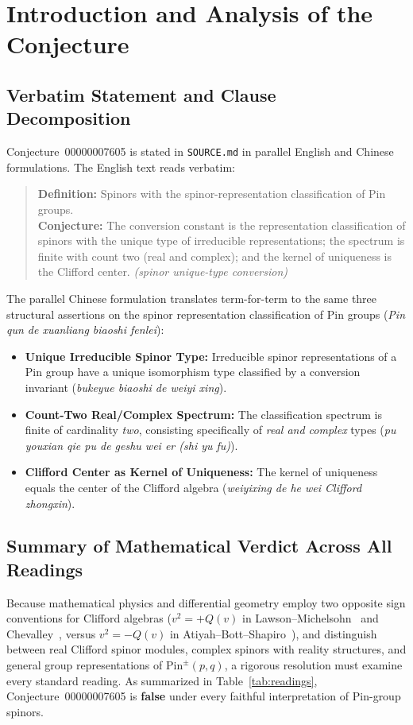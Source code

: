 \documentclass[11pt,a4paper]{article}
\theoremstyle{plain}
\theoremstyle{definition}
\newcommand{\Pin}{\mathrm{Pin}}
\begin{document}
\section{Introduction and Analysis of the Conjecture}

\subsection{Verbatim Statement and Clause Decomposition}
Conjecture~00000007605 is stated in \texttt{SOURCE.md} in parallel English and Chinese formulations. The English text reads verbatim:
\begin{quote}
\textbf{Definition:} Spinors with the spinor-representation classification of Pin groups.\\
\textbf{Conjecture:} The conversion constant is the representation classification of spinors with the unique type of irreducible representations; the spectrum is finite with count two (real and complex); and the kernel of uniqueness is the Clifford center. \emph{(spinor unique-type conversion)}
\end{quote}
The parallel Chinese formulation translates term-for-term to the same three structural assertions on the spinor representation classification of $\Pin$ groups (\emph{Pin qun de xuanliang biaoshi fenlei}):
\begin{itemize}
\item[\textbf{(Claim A)}] \textbf{Unique Irreducible Spinor Type:} Irreducible spinor representations of a $\Pin$ group have a unique isomorphism type classified by a conversion invariant (\emph{bukeyue biaoshi de weiyi xing}).
\item[\textbf{(Claim B)}] \textbf{Count-Two Real/Complex Spectrum:} The classification spectrum is finite of cardinality \emph{two}, consisting specifically of \emph{real and complex} types (\emph{pu youxian qie pu de geshu wei er (shi yu fu)}).
\item[\textbf{(Claim C)}] \textbf{Clifford Center as Kernel of Uniqueness:} The kernel of uniqueness equals the center of the Clifford algebra (\emph{weiyixing de he wei Clifford zhongxin}).
\end{itemize}

\subsection{Summary of Mathematical Verdict Across All Readings}
Because mathematical physics and differential geometry employ two opposite sign conventions for Clifford algebras ($v^2 = +Q(v)$ in Lawson--Michelsohn~\cite{LM89} and Chevalley~\cite{Che54}, versus $v^2 = -Q(v)$ in Atiyah--Bott--Shapiro~\cite{ABS64}), and distinguish between real Clifford spinor modules, complex spinors with reality structures, and general group representations of $\Pin^\pm(p,q)$, a rigorous resolution must examine every standard reading. As summarized in Table~\ref{tab:readings}, Conjecture~00000007605 is \textbf{false} under every faithful interpretation of $\Pin$-group spinors.
\end{document}
